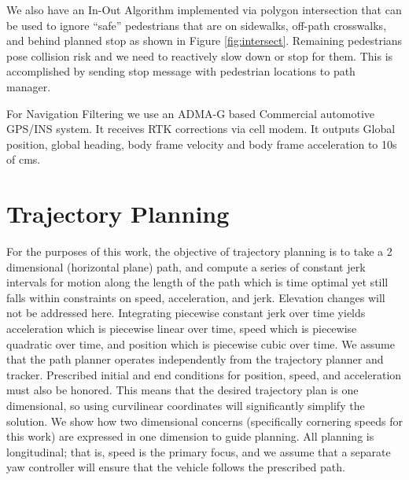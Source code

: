 \documentclass[letterpaper, 10 pt, conference]{ieeeconf}  %
\begin{document}
We also have an In-Out Algorithm implemented via polygon intersection that can be used to
ignore “safe” pedestrians that are on sidewalks, off-path crosswalks, and behind planned stop
as shown in Figure \ref{fig:intersect}.
Remaining pedestrians pose collision risk and we need to reactively slow down or stop for them.
This is accomplished by sending stop message with pedestrian locations to path manager.

For Navigation Filtering we use an ADMA-G based Commercial automotive GPS/INS system.
It receives RTK corrections via cell modem.
It outputs Global position, global heading,
body frame velocity and body frame acceleration to 10s of cms.


\section{Trajectory Planning} \label{sec:trajectoryplanning}

For the purposes of this work, the objective of trajectory planning is to take a 2 dimensional (horizontal plane) path, and compute a series of constant jerk intervals for motion along the length of the path which is time optimal yet still falls within constraints on speed, acceleration, and jerk.
Elevation changes will not be addressed here.
Integrating piecewise constant jerk over time yields acceleration which is piecewise linear over time, speed which is piecewise quadratic over time, and position which is piecewise cubic over time.
We assume that the path planner operates independently from the trajectory planner and tracker.
Prescribed initial and end conditions for position, speed, and acceleration must also be honored.
This means that the desired trajectory plan is one dimensional, so using curvilinear coordinates will significantly simplify the solution.
We show how two dimensional concerns (specifically cornering speeds for this work) are expressed in one dimension to guide planning.
All planning is longitudinal; that is, speed is the primary focus, and we assume that a separate yaw controller will ensure that the vehicle follows the prescribed path.
\end{document}
